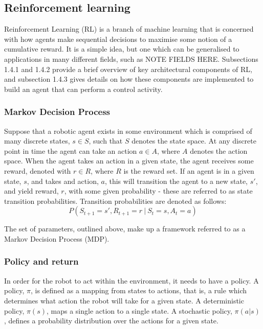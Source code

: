 \documentclass[12pt, a4paper]{article}
\begin{document}
\subsection{Reinforcement learning}

Reinforcement Learning (RL) is a branch of machine learning that is concerned with how agents make sequential decisions to maximise some notion of a cumulative reward. It is a simple idea, but one which can be generalised to applications in many different fields, such as NOTE FIELDS HERE. Subsections 1.4.1 and 1.4.2 provide a brief overview of key architectural components of RL, and subsection 1.4.3 gives details on how these components are implemented to build an agent that can perform a control activity.

\subsubsection{Markov Decision Process}
Suppose that a robotic agent exists in some environment which is comprised of many discrete states, $s \in S$, such that $S$ denotes the state space. At any discrete point in time the agent can take an action $a \in A$, where $A$ denotes the action space. When the agent takes an action in a given state, the agent receives some reward, denoted with $r \in R$, where $R$ is the reward set. If an agent is in a given state, $s$, and takes and action, $a$, this will transition the agent to a new state, $s'$, and yield reward, $r$, with some given probability - these are referred to as state transition probabilities. Transition probabilities are denoted as follows:
\begin{equation}
P(S_{t+1}=s', R_{t+1}=r \ | \ S_t = s, A_t = a)
\end{equation}

The set of parameters, outlined above, make up a framework referred to as a Markov Decision Process (MDP).

\subsubsection{Policy and return}
In order for the robot to act within the environment, it needs to have a policy. A policy, $\pi$, is defined as a mapping from states to actions, that is, a rule which determines what action the robot will take for a given state. A deterministic policy, $\pi (s)$, maps a single action to a single state. A stochastic policy, $\pi (a | s)$, defines a probability distribution over the actions for a given state.\\
\end{document}
